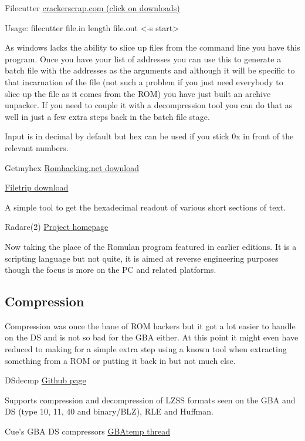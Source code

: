 \documentclass[
]{book}
\begin{document}
Filecutter \href{http://crackerscrap.com/}{crackerscrap.com (click on downloads)}

Usage: filecutter file.in length file.out \textless-s start\textgreater{}

As windows lacks the ability to slice up files from the command line you have this program. Once you have your list of addresses you can use this to generate a batch file with the addresses as the arguments and although it will be specific to that incarnation of the file (not such a problem if you just need everybody to slice up the file as it comes from the ROM) you have just built an archive unpacker. If you need to couple it with a decompression tool you can do that as well in just a few extra steps back in the batch file stage.

Input is in decimal by default but hex can be used if you stick 0x in front of the relevant numbers.

Getmyhex \href{http://www.romhacking.net/utilities/504/}{Romhacking.net download}

\href{http://filetrip.net/pc-downloads/applications/download-getmyhex-1500-f29200.html}{Filetrip download}

A simple tool to get the hexadecimal readout of various short sections of text.

Radare(2) \href{http://radare.org/y/}{Project homepage}

Now taking the place of the Romulan program featured in earlier editions. It is a scripting language but not quite, it is aimed at reverse engineering purposes though the focus is more on the PC and related platforms.

\hypertarget{compression}{%
\subsection{Compression}\label{compression}}

Compression was once the bane of ROM hackers but it got a lot easier to handle on the DS and is not so bad for the GBA either. At this point it might even have reduced to making for a simple extra step using a known tool when extracting something from a ROM or putting it back in but not much else.

DSdecmp \href{https://github.com/barubary/dsdecmp}{Github page}

Supports compression and decompression of LZSS formats seen on the GBA and DS (type 10, 11, 40 and binary/BLZ), RLE and Huffman.

Cue's GBA DS compressors \href{http://gbatemp.net/topic/313278-nintendo-dsgba-compressors/}{GBAtemp thread}
\end{document}
